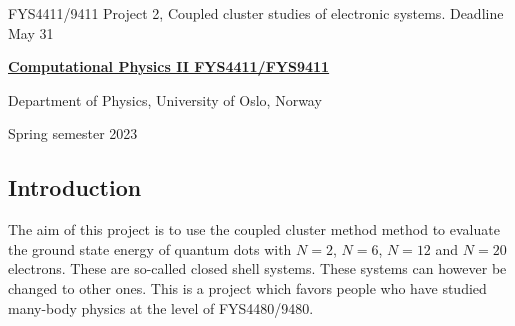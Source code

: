 \documentclass[%
oneside,                 %
final,                   %
10pt]{article}
\begin{document}

\newcommand{\exercisesection}[1]{\subsection*{#1}}






\thispagestyle{empty}

\begin{center}
{\LARGE\bf
\begin{spacing}{1.25}
FYS4411/9411 Project 2, Coupled cluster studies of electronic systems. Deadline May 31
\end{spacing}
}
\end{center}


\begin{center}
{\bf \href{{http://www.uio.no/studier/emner/matnat/fys/FYS4411/index-eng.html}}{Computational Physics II FYS4411/FYS9411}}
\end{center}

    \begin{center}
\centerline{{\small Department of Physics, University of Oslo, Norway}}
\end{center}
    

\begin{center}
Spring semester 2023
\end{center}

\vspace{1cm}


\subsection*{Introduction}

The aim of this project is to use the coupled cluster method
method to evaluate 
the ground state energy of 
quantum dots with $N=2$, $N=6$, $N=12$ and $N=20$ electrons. These are so-called closed shell systems.
These systems can however be changed to other ones. This is a project which favors people who have studied many-body physics at the level of FYS4480/9480.
\end{document}
